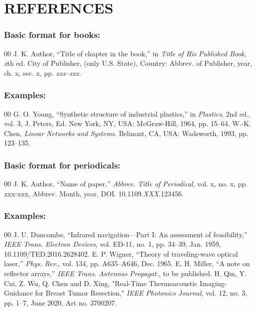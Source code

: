 \section*{REFERENCES}

\def\refname{\vadjust{\vspace*{-1em}}} %

\subsubsection*{Basic format for books:}

\begin{thebibliography}{00}
 J. K. Author, ``Title of chapter in the book,'' in \textit{Title of His Published Book, x}th ed. City of Publisher,
(only U.S. State), Country: Abbrev. of Publisher, year, ch. x, sec. x, pp.
\textit{xxx--xxx.}
\end{thebibliography}

\subsubsection*{Examples:}

\begin{thebibliography}{00}
 G. O. Young, ``Synthetic structure of industrial
plastics,'' in \emph{Plastics}, 2nd ed., vol. 3, J. Peters, Ed. New York, NY, USA: McGraw-Hill, 1964, pp. 15--64.
 W.-K. Chen, \emph{Linear Networks and Systems}. Belmont, CA, USA: Wadsworth, 1993, pp. 123--135.
\end{thebibliography}

\subsubsection*{Basic format for periodicals:}

\begin{thebibliography}{00}
 J. K. Author, ``Name of paper,'' \textit{Abbrev. Title of Periodical}, vol. x, no. x, pp. xxx-xxx, Abbrev. Month, year, DOI.
10.1109.\textit{XXX}.123456.
\end{thebibliography}

\subsubsection*{Examples:}

\begin{thebibliography}{00}
 J. U. Duncombe, ``Infrared navigation---Part I: An
assessment of feasibility,'' \emph{IEEE Trans. Electron Devices}, vol. ED-11, no. 1, pp. 34--39, Jan. 1959, 10.1109/TED.2016.2628402.
 E. P. Wigner, ``Theory of traveling-wave optical laser,'' 
\emph{Phys. Rev.}, vol. 134, pp. A635--A646, Dec. 1965.
 E. H. Miller, ``A note on reflector arrays,'' \emph{IEEE
Trans. Antennas Propagat.}, to be published.
 H. Qin, Y. Cui, Z. Wu, Q. Chen and D. Xing, "Real-Time
Thermoacoustic Imaging-Guidance for Breast Tumor Resection," \emph{IEEE Photonics Journal}, vol. 12, no. 3, pp. 1--7, June 2020, Art no. 3700207.
\end{thebibliography}


